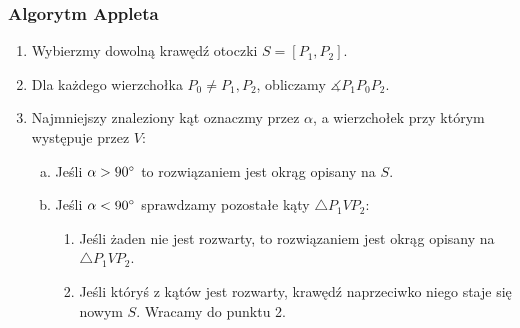 \documentclass{beamer}
\begin{document}
\begin{frame}

\frametitle{Algorytm Appleta}

\begin{enumerate}[1.]

\item Wybierzmy dowolną krawędź otoczki $S  = [P_1, P_2]$.

\item Dla każdego wierzchołka $P_0 \neq P_1, P_2$, 
obliczamy $ \measuredangle P_1 P_0 P_2 $. 

\item Najmniejszy znaleziony kąt oznaczmy przez $\alpha$, 
a wierzchołek przy którym występuje przez $V$:

\begin{enumerate}[a)]

\item Jeśli $ \alpha > 90 \degree $ to rozwiązaniem jest okrąg opisany na $S$. 
\item  Jeśli $ \alpha < 90 \degree $ sprawdzamy pozostałe 
kąty $ \triangle P_1 V P_2 $:

\begin{enumerate}[-]
\item  Jeśli żaden nie jest rozwarty, to rozwiązaniem 
jest okrąg opisany na $ \triangle P_1 V P_2 $.

\item Jeśli któryś z kątów jest rozwarty, krawędź naprzeciwko niego
staje się nowym $S$. Wracamy do punktu 2.

\end{enumerate}

\end{enumerate}

\end{enumerate}

\end{frame}


\end{document}
